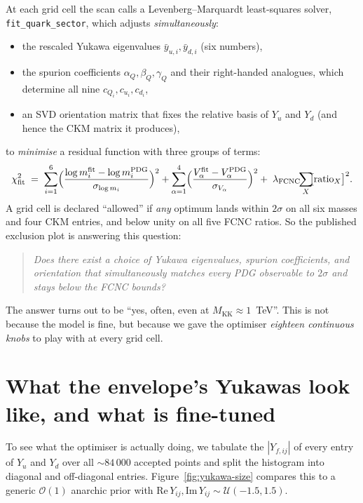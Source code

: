 \documentclass[11pt]{article}
\newcommand{\Mkk}{M_{\mathrm{KK}}}
\newcommand{\Yu}{Y_u}
\newcommand{\Yd}{Y_d}
\begin{document}
At each grid cell the scan calls a Levenberg--Marquardt least-squares
solver, \texttt{fit\_quark\_sector}, which adjusts \emph{simultaneously}:
\begin{itemize}[leftmargin=2em,itemsep=1pt]
  \item the rescaled Yukawa eigenvalues $\bar y_{u,i},\bar y_{d,i}$
        (six numbers),
  \item the spurion coefficients $\alpha_Q,\beta_Q,\gamma_Q$ and their
        right-handed analogues, which determine all nine
        $c_{Q_i},c_{u_i},c_{d_i}$,
  \item an SVD orientation matrix that fixes the relative basis of $\Yu$
        and $\Yd$ (and hence the CKM matrix it produces),
\end{itemize}
to \emph{minimise} a residual function with three groups of terms:
\begin{equation}
  \chi^2_{\mathrm{fit}} \;=\;
   \sum_{i=1}^{6}\Bigl(\frac{\log m_i^{\mathrm{fit}} - \log m_i^{\mathrm{PDG}}}
                            {\sigma_{\log m_i}}\Bigr)^2
   +
   \sum_{\alpha=1}^{4}\Bigl(\frac{V_\alpha^{\mathrm{fit}} - V_\alpha^{\mathrm{PDG}}}
                                 {\sigma_{V_\alpha}}\Bigr)^2
   +\;\lambda_{\mathrm{FCNC}}\!\!\sum_{X}\!\!\bigl[\mathrm{ratio}_X\bigr]^2 .
\end{equation}
A grid cell is declared ``allowed'' if \emph{any} optimum lands within
$2\sigma$ on all six masses and four CKM entries, and below unity on all
five FCNC ratios. So the published exclusion plot is answering this
question:
\begin{quote}\itshape
  Does there exist a choice of Yukawa eigenvalues, spurion coefficients,
  and orientation that simultaneously matches every PDG observable to
  $2\sigma$ and stays below the FCNC bounds?
\end{quote}
The answer turns out to be ``yes, often, even at $\Mkk \approx 1$~TeV''.
This is not because the model is fine, but because we gave the optimiser
\emph{eighteen continuous knobs} to play with at every grid cell.

\section{What the envelope's Yukawas look like, and what is fine-tuned}
\label{sec:envelope-yukawa}

To see what the optimiser is actually doing, we tabulate the $|Y_{f,ij}|$
of every entry of $\Yu$ and $\Yd$ over all $\sim 84\,000$ accepted points
and split the histogram into diagonal and off-diagonal entries.
Figure~\ref{fig:yukawa-size} compares this to a generic
$\mathcal{O}(1)$ anarchic prior with
$\mathrm{Re}\,Y_{ij},\mathrm{Im}\,Y_{ij}\sim\mathcal{U}(-1.5,1.5)$.
\end{document}
